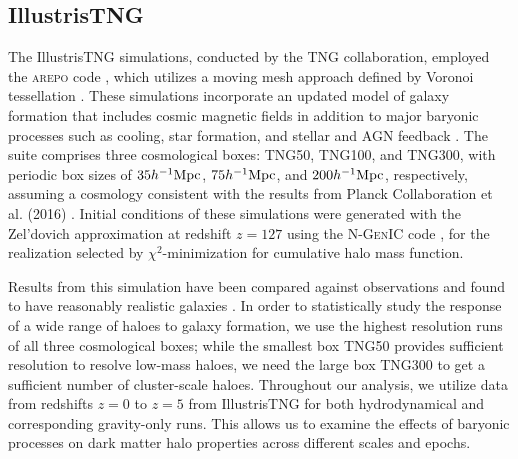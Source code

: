 \subsection{IllustrisTNG}
\label{sec:sims-IllTNG}
The IllustrisTNG simulations, conducted by the TNG collaboration, employed the \textsc{arepo} code \citep[][]{2020ApJS..248...32W}, which utilizes a moving mesh approach defined by Voronoi tessellation \citep[][]{2010MNRAS.401..791S}. These simulations incorporate an updated model of galaxy formation that includes cosmic magnetic fields in addition to major baryonic processes such as cooling, star formation, and stellar and AGN feedback \citep[][]{2017MNRAS.465.3291W,2018MNRAS.473.4077P}. The suite comprises three cosmological boxes: TNG50, TNG100, and TNG300, with periodic box sizes of $35 h^{-1}{\rm Mpc}$, $75 h^{-1}{\rm Mpc}$, and $200 h^{-1}{\rm Mpc}$, respectively, assuming a cosmology consistent with the results from Planck Collaboration et al. (2016) \cite{2016A&A...594A..13P}. Initial conditions of these simulations were generated with the Zel'dovich approximation \citep[][]{1970A&A.....5...84Z} at redshift $z=127$ using the \textsc{N-GenIC} code \citep[][]{2015ascl.soft02003S}, for the realization selected by $\chi^2$-minimization for cumulative halo mass function.

Results from this simulation have been compared against observations and found to have reasonably realistic galaxies \citep[][]{2018MNRAS.475..624N,2018MNRAS.475..648P,2018MNRAS.475..676S,2018MNRAS.477.1206N,2018MNRAS.480.5113M,2019MNRAS.490.3196P,2019MNRAS.490.3234N}. In order to statistically study the response of a wide range of haloes to galaxy formation, we use the highest resolution runs of all three cosmological boxes; while the smallest box TNG50 provides sufficient resolution to resolve low-mass haloes, we need the large box TNG300 to get a sufficient number of cluster-scale haloes. Throughout our analysis, we utilize data from redshifts $z=0$ to $z=5$ from IllustrisTNG for both hydrodynamical and corresponding gravity-only runs. This allows us to examine the effects of baryonic processes on dark matter halo properties across different scales and epochs.

